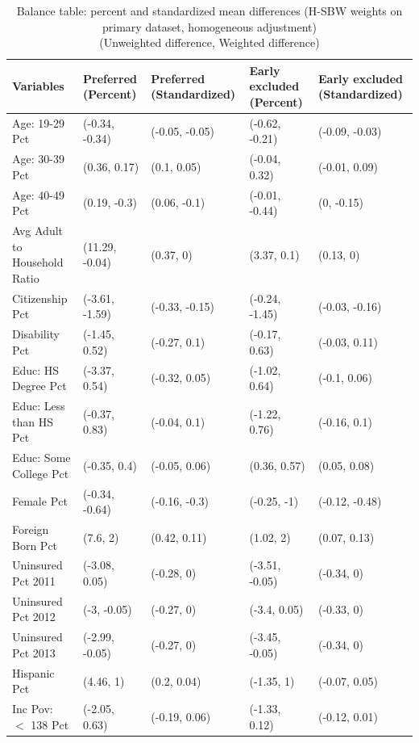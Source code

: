 \newpage

\begin{landscape}
\begin{table}[h!]\caption{Balance table: percent and standardized mean differences (H-SBW weights on primary dataset, homogeneous adjustment) \\ (Unweighted difference, Weighted difference)}\label{tab:baltab1}
\centering
\begin{threeparttable}\begin{tabular}{lllll}
  \hline
Variables & Preferred (Percent) & Preferred (Standardized) & Early excluded (Percent) & Early excluded (Standardized) \\ 
  \hline
Age: 19-29 Pct & (-0.34, -0.34) & (-0.05, -0.05) & (-0.62, -0.21) & (-0.09, -0.03) \\ 
  Age: 30-39 Pct & (0.36, 0.17) & (0.1, 0.05) & (-0.04, 0.32) & (-0.01, 0.09) \\ 
  Age: 40-49 Pct & (0.19, -0.3) & (0.06, -0.1) & (-0.01, -0.44) & (0, -0.15) \\ 
  Avg Adult to Household Ratio & (11.29, -0.04) & (0.37, 0) & (3.37, 0.1) & (0.13, 0) \\ 
  Citizenship Pct & (-3.61, -1.59) & (-0.33, -0.15) & (-0.24, -1.45) & (-0.03, -0.16) \\ 
  Disability Pct & (-1.45, 0.52) & (-0.27, 0.1) & (-0.17, 0.63) & (-0.03, 0.11) \\ 
  Educ: HS Degree Pct & (-3.37, 0.54) & (-0.32, 0.05) & (-1.02, 0.64) & (-0.1, 0.06) \\ 
  Educ: Less than HS Pct & (-0.37, 0.83) & (-0.04, 0.1) & (-1.22, 0.76) & (-0.16, 0.1) \\ 
  Educ: Some College Pct & (-0.35, 0.4) & (-0.05, 0.06) & (0.36, 0.57) & (0.05, 0.08) \\ 
  Female Pct & (-0.34, -0.64) & (-0.16, -0.3) & (-0.25, -1) & (-0.12, -0.48) \\ 
  Foreign Born Pct & (7.6, 2) & (0.42, 0.11) & (1.02, 2) & (0.07, 0.13) \\ 
  Uninsured Pct 2011 & (-3.08, 0.05) & (-0.28, 0) & (-3.51, -0.05) & (-0.34, 0) \\ 
  Uninsured Pct 2012 & (-3, -0.05) & (-0.27, 0) & (-3.4, 0.05) & (-0.33, 0) \\ 
  Uninsured Pct 2013 & (-2.99, -0.05) & (-0.27, 0) & (-3.45, -0.05) & (-0.34, 0) \\ 
  Hispanic Pct & (4.46, 1) & (0.2, 0.04) & (-1.35, 1) & (-0.07, 0.05) \\ 
  Inc Pov: $<$ 138 Pct & (-2.05, 0.63) & (-0.19, 0.06) & (-1.33, 0.12) & (-0.12, 0.01) \\ 

\end{tabular}
\end{threeparttable}
\end{table}
\end{landscape}

